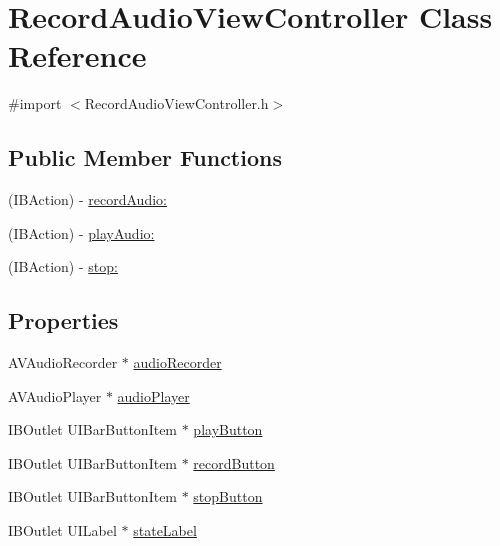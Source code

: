 \hypertarget{interface_record_audio_view_controller}{\section{\-Record\-Audio\-View\-Controller \-Class \-Reference}
\label{interface_record_audio_view_controller}
}


{\ttfamily \#import $<$\-Record\-Audio\-View\-Controller.\-h$>$}

\subsection*{\-Public \-Member \-Functions}
\begin{DoxyCompactItemize}
\item 
(\-I\-B\-Action) -\/ \hyperlink{interface_record_audio_view_controller_aefe8517fc01acd642f778f4de3780b9d}{record\-Audio\-:}
\item 
(\-I\-B\-Action) -\/ \hyperlink{interface_record_audio_view_controller_a18ab916275052869e9361770043f51f2}{play\-Audio\-:}
\item 
(\-I\-B\-Action) -\/ \hyperlink{interface_record_audio_view_controller_aeda9e119ecb2e5ef19bdcf60389c864f}{stop\-:}
\end{DoxyCompactItemize}
\subsection*{\-Properties}
\begin{DoxyCompactItemize}
\item 
\-A\-V\-Audio\-Recorder $\ast$ \hyperlink{interface_record_audio_view_controller_a46db6341189de2d6df5a1c1bba138590}{audio\-Recorder}
\item 
\-A\-V\-Audio\-Player $\ast$ \hyperlink{interface_record_audio_view_controller_ad344ae84bbb7f21f9b08328bdab8c7d6}{audio\-Player}
\item 
\-I\-B\-Outlet \-U\-I\-Bar\-Button\-Item $\ast$ \hyperlink{interface_record_audio_view_controller_a059154392a31aa12b30f30341dd92886}{play\-Button}
\item 
\-I\-B\-Outlet \-U\-I\-Bar\-Button\-Item $\ast$ \hyperlink{interface_record_audio_view_controller_aa8ba4e740c0764274a9c3c51b87f055a}{record\-Button}
\item 
\-I\-B\-Outlet \-U\-I\-Bar\-Button\-Item $\ast$ \hyperlink{interface_record_audio_view_controller_a65f9aafbdd50215aa5b3572614428bfb}{stop\-Button}
\item 
\-I\-B\-Outlet \-U\-I\-Label $\ast$ \hyperlink{interface_record_audio_view_controller_a52534242d22e0b6ea43902c6e3a5b3f6}{state\-Label}
\end{DoxyCompactItemize}


